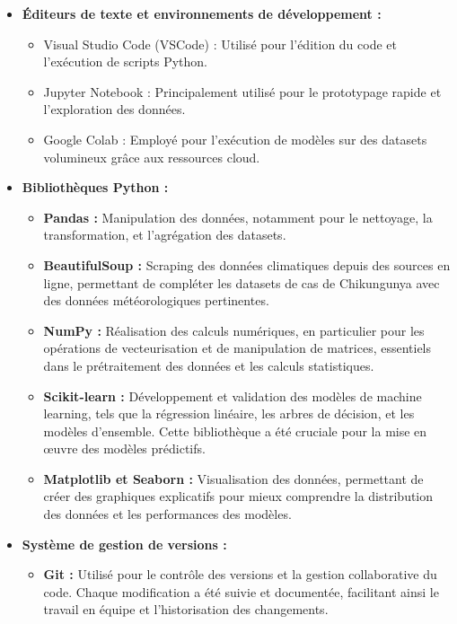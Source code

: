 \begin{itemize}
	\item \textbf{Éditeurs de texte et environnements de développement :}
	\begin{itemize}
		\item Visual Studio Code (VSCode) : Utilisé pour l'édition du code et l'exécution de scripts Python.
		\item Jupyter Notebook : Principalement utilisé pour le prototypage rapide et l'exploration des données.
		\item Google Colab : Employé pour l'exécution de modèles sur des datasets volumineux grâce aux ressources cloud.
	\end{itemize}
	\item \textbf{Bibliothèques Python :}
	\begin{itemize}
		\item \textbf{Pandas :} Manipulation des données, notamment pour le nettoyage, la transformation, et l'agrégation des datasets.
		\item \textbf{BeautifulSoup :} Scraping des données climatiques depuis des sources en ligne, permettant de compléter les datasets de cas de Chikungunya avec des données météorologiques pertinentes.
		\item \textbf{NumPy :} Réalisation des calculs numériques, en particulier pour les opérations de vecteurisation et de manipulation de matrices, essentiels dans le prétraitement des données et les calculs statistiques.
		\item \textbf{Scikit-learn :} Développement et validation des modèles de machine learning, tels que la régression linéaire, les arbres de décision, et les modèles d'ensemble. Cette bibliothèque a été cruciale pour la mise en œuvre des modèles prédictifs.
		\item \textbf{Matplotlib et Seaborn :} Visualisation des données, permettant de créer des graphiques explicatifs pour mieux comprendre la distribution des données et les performances des modèles.
	\end{itemize}
	\item \textbf{Système de gestion de versions :}
	\begin{itemize}
		\item \textbf{Git :} Utilisé pour le contrôle des versions et la gestion collaborative du code. Chaque modification a été suivie et documentée, facilitant ainsi le travail en équipe et l'historisation des changements.
	\end{itemize}
\end{itemize}

